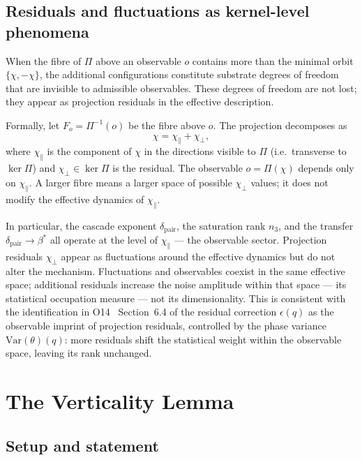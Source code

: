 \documentclass[11pt,a4paper]{article}
\newcommand{\bstar}{\beta^*}
\newcommand{\dpair}{\delta_{\mathrm{pair}}}
\begin{document}
    \subsection{Residuals and fluctuations as kernel-level phenomena}
      \label{sec:residuals}

      When the fibre of $\Pi$ above an observable $o$ contains more than the minimal orbit
      $\{\chi, -\chi\}$, the additional configurations constitute substrate degrees of freedom that
      are invisible to admissible observables.
      These degrees of freedom are not lost; they appear as projection residuals in the effective
      description.

      Formally, let $F_o = \Pi^{-1}(o)$ be the fibre above $o$.
      The projection decomposes as
      \[
        \chi = \chi_{\parallel} + \chi_{\perp},
      \]
      where $\chi_{\parallel}$ is the component of $\chi$ in the directions visible to $\Pi$
      (i.e.\ transverse to $\ker\Pi$) and $\chi_{\perp} \in \ker\Pi$ is the residual.
      The observable $o = \Pi(\chi)$ depends only on $\chi_{\parallel}$.
      A larger fibre means a larger space of possible $\chi_{\perp}$ values; it does not modify
      the effective dynamics of $\chi_{\parallel}$.

      In particular, the cascade exponent $\dpair$, the saturation rank $n_3$, and the transfer
      $\dpair \to \bstar$ all operate at the level of $\chi_{\parallel}$ --- the observable sector.
      Projection residuals $\chi_{\perp}$ appear as fluctuations around the effective dynamics but
      do not alter the mechanism.
      Fluctuations and observables coexist in the same effective space; additional residuals
      increase the noise amplitude within that space --- its statistical occupation measure ---
      not its dimensionality.
      This is consistent with the identification in O14~\cite{Beau2026a18} Section~6.4 of the
      residual correction $\epsilon(q)$ as the observable imprint of projection residuals, controlled
      by the phase variance $\mathrm{Var}(\theta)(q)$: more residuals shift the statistical weight
      within the observable space, leaving its rank unchanged.

  \section{The Verticality Lemma}
    \label{sec:verticality}

    \subsection{Setup and statement}
      \label{sec:setup}
\end{document}
